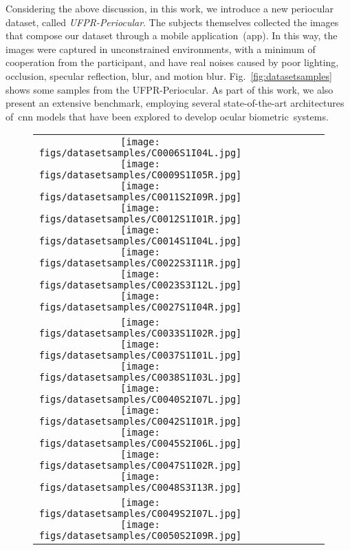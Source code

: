 \documentclass[journal]{IEEEtran}
\begin{document}
Considering the above discussion, in this work, we introduce a new periocular dataset, called \emph{UFPR-Periocular}.
The subjects themselves collected the images that compose our dataset through a mobile application~(app).
In this way, the images were captured in unconstrained environments, with a minimum of cooperation from the participant, and have real noises caused by poor lighting, occlusion, specular reflection, blur, and motion blur.
Fig.~\ref{fig:datasetsamples} shows some samples from the UFPR-Periocular. 
As part of this work, we also present an extensive benchmark, employing several state-of-the-art architectures of~\gls{cnn} models that have been explored to develop ocular biometric~systems.

\begin{figure}[!ht]
\centering
\begin{tabular}{cccccccc}
    \hspace{-2.7mm}
	{\texttt{[image: figs/datasetsamples/C0006S1I04L.jpg]}} 
	{\texttt{[image: figs/datasetsamples/C0009S1I05R.jpg]}}
    {\texttt{[image: figs/datasetsamples/C0011S2I09R.jpg]}}
    {\texttt{[image: figs/datasetsamples/C0012S1I01R.jpg]}}
    {\texttt{[image: figs/datasetsamples/C0014S1I04L.jpg]}}
    {\texttt{[image: figs/datasetsamples/C0022S3I11R.jpg]}}
    {\texttt{[image: figs/datasetsamples/C0023S3I12L.jpg]}}
    {\texttt{[image: figs/datasetsamples/C0027S1I04R.jpg]}} 
    \\
    \hspace{-2.7mm}
	{\texttt{[image: figs/datasetsamples/C0033S1I02R.jpg]}}
	{\texttt{[image: figs/datasetsamples/C0037S1I01L.jpg]}}
    {\texttt{[image: figs/datasetsamples/C0038S1I03L.jpg]}}
    {\texttt{[image: figs/datasetsamples/C0040S2I07L.jpg]}}
    {\texttt{[image: figs/datasetsamples/C0042S1I01R.jpg]}}
    {\texttt{[image: figs/datasetsamples/C0045S2I06L.jpg]}}
    {\texttt{[image: figs/datasetsamples/C0047S1I02R.jpg]}}
    {\texttt{[image: figs/datasetsamples/C0048S3I13R.jpg]}} 
    \\
    \hspace{-2.7mm}
	{\texttt{[image: figs/datasetsamples/C0049S2I07L.jpg]}}
	{\texttt{[image: figs/datasetsamples/C0050S2I09R.jpg]}}

\end{tabular}
\end{figure}
\end{document}
